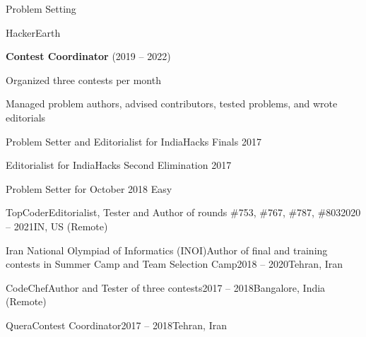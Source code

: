 \begin{section}{Problem Setting}
  \begin{subsection}{HackerEarth}{}{}{}
    \item \textbf{Contest Coordinator} (2019 – 2022)
    \item Organized three contests per month
    \item Managed problem authors, advised contributors, tested problems, and wrote editorials
    \item Problem Setter and Editorialist for IndiaHacks Finals 2017
    \item Editorialist for IndiaHacks Second Elimination 2017
    \item Problem Setter for October 2018 Easy
  \end{subsection}
  \begin{subsection}{TopCoder}{Editorialist, Tester and Author of rounds \#753, \#767, \#787, \#803}{2020 -- 2021}{IN, US (Remote)}
  \end{subsection}
  \begin{subsection}{Iran National Olympiad of Informatics (INOI)}{Author of final and training contests in Summer Camp and Team Selection Camp}{2018 -- 2020}{Tehran, Iran}
  \end{subsection}
  \begin{subsection}{CodeChef}{Author and Tester of three contests}{2017 -- 2018}{Bangalore, India (Remote)}
  \end{subsection}
  \begin{subsection}{Quera}{Contest Coordinator}{2017 -- 2018}{Tehran, Iran}
  \end{subsection}
  
\end{section}